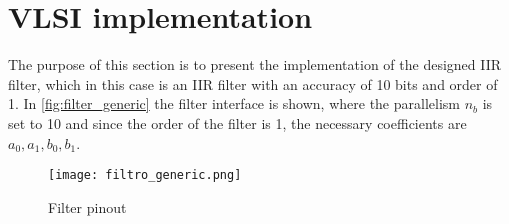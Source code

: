 \section{VLSI implementation}
\graphicspath{{sec2/images/}}
The purpose of this section is to present the implementation of the designed IIR filter, which in this case is an IIR filter with an accuracy of 10 bits and order of 1. In \autoref{fig:filter_generic} the filter interface is shown, where the parallelism $n_b$ is set to 10 and since the order of the filter is 1, the necessary coefficients are $a_0, a_1, b_0, b_1$.

\begin{figure}[h]
	\center
	\texttt{[image: filtro\_generic.png]}
	\caption{Filter pinout}
	\label{fig:filtro_generic}
\end{figure}






\pagebreak
